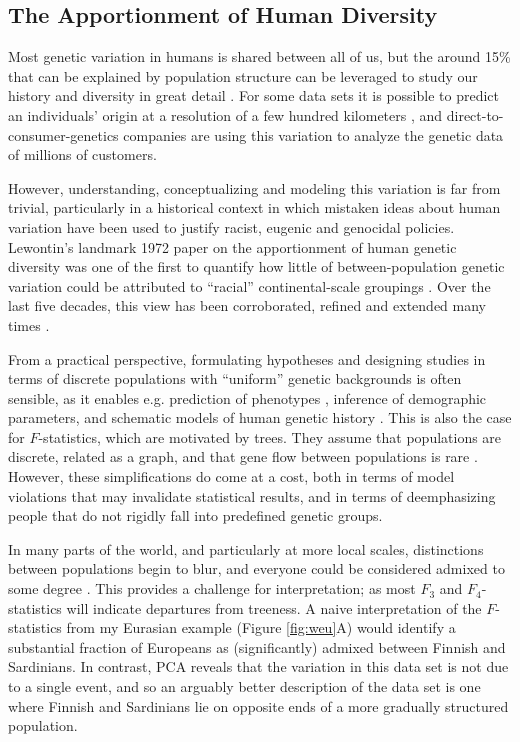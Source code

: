 \documentclass[12pt,fullpage, a4paper]{article}
\begin{document}
\subsection{The Apportionment of Human Diversity}
Most genetic variation in humans is shared between all of us, but the around 15\% that can be explained by population structure can be leveraged to study our history and diversity in great detail \citep{dobzhansky1972, cavalli-sforza1964, reich2018a}. For some data sets it is possible to predict an individuals' origin at a resolution of a few hundred kilometers \citep{novembre2008, leslie2015}, and direct-to-consumer-genetics companies are using this variation to analyze the genetic data of millions of customers. 

However, understanding, conceptualizing and modeling this variation is far from trivial, particularly in a historical context in which mistaken ideas about human variation have been used to justify racist, eugenic and genocidal policies. Lewontin’s landmark 1972 paper on the apportionment of human genetic diversity was one of the first to quantify how little of between-population genetic variation could be attributed to ``racial'' continental-scale groupings \citep{novembre2022}. Over the last five decades, this view has been corroborated, refined and extended many times \citep{cann1987, cavalli-sforza1994, barbujani1997, rosenberg2002a}. 

From a practical perspective, formulating hypotheses and designing studies in terms of discrete populations with ``uniform'' genetic backgrounds is often sensible, as it enables  e.g. prediction of phenotypes \citep{berg2019, yair2021}, inference of demographic parameters, and schematic models of human genetic history \citep{patterson2012}. This is also the case for $F$-statistics, which are motivated by trees. They assume that populations are discrete, related as a graph, and that gene flow between populations is rare \citep{patterson2012,harney2021}.
However, these simplifications do come at a cost, both in terms of model violations that may invalidate statistical results, and in terms of deemphasizing people that do not rigidly fall into predefined genetic groups.


In many parts of the world, and particularly at more local scales, distinctions between populations begin to blur, and everyone could be considered  admixed to some degree \citep{pickrell2014}. This provides a challenge for interpretation; as most $F_3$ and $F_4$-statistics will indicate departures from treeness. A naive interpretation of the $F$-statistics from my Eurasian example  (Figure \ref{fig:weu}A) would identify a substantial fraction of Europeans as (significantly) admixed between Finnish and Sardinians. In contrast, PCA reveals that the variation in this data set is not due to a single event, and so an arguably better description of the data set is one where Finnish and Sardinians lie on opposite ends of a more gradually structured population.
\end{document}
